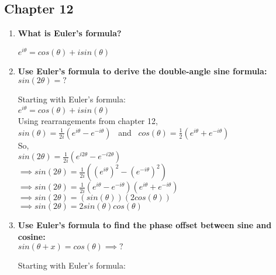 \clearpage
\subsection{Chapter 12}

\begin{enumerate}

\item{\bf What is Euler's formula?}

\tab \tab $e^{i\theta} = cos(\theta) + i sin(\theta)$\\

\item{\bf Use Euler's formula to derive the double-angle sine formula: \\ $sin(2\theta)=?$}

Starting with Euler's formula:\\

\tab \tab $e^{i\theta} = cos(\theta) + i sin(\theta)$\\

Using rearrangements from chapter 12,\\

\tab \tab $sin(\theta) = \frac{1}{2i}(e^{i\theta} - e^{-i\theta})$ \  and \  $cos(\theta) = \frac{1}{2}(e^{i\theta} + e^{-i\theta})$\\

So,\\

\tab \tab $sin(2\theta) = \frac{1}{2i}(e^{i2\theta} - e^{-i2\theta})$\\

\tab \tab $\implies sin(2\theta) = \frac{1}{2i}((e^{i\theta})^{2} - (e^{-i\theta})^{2})$\\

\tab \tab $\implies sin(2\theta) = \frac{1}{2i} (e^{i\theta} - e^{-i\theta}) (e^{i\theta} + e^{-i\theta}) $\\

\tab \tab $\implies sin(2\theta) = (sin(\theta))(2cos(\theta))$\\

\tab \tab $\implies sin(2\theta) = 2sin(\theta)cos(\theta)$\\

\item{\bf Use Euler's formula to find the phase offset between sine and cosine: \\ $sin(\theta + x) = cos(\theta) \implies ?$}

Starting with Euler's formula:\\


\end{enumerate}
